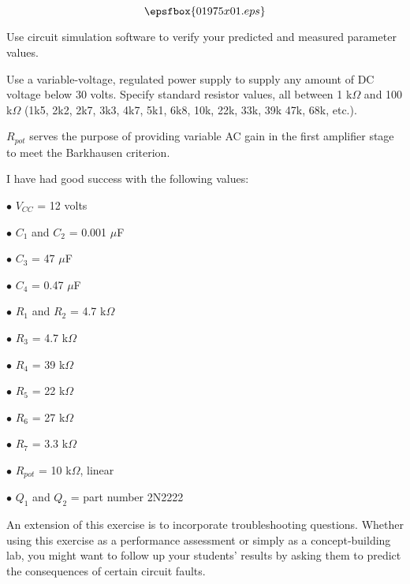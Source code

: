 

$$\epsfbox{01975x01.eps}$$

\vfil \eject






Use circuit simulation software to verify your predicted and measured parameter values.







Use a variable-voltage, regulated power supply to supply any amount of DC voltage below 30 volts.  Specify standard resistor values, all between 1 k$\Omega$ and 100 k$\Omega$ (1k5, 2k2, 2k7, 3k3, 4k7, 5k1, 6k8, 10k, 22k, 33k, 39k 47k, 68k, etc.). 

$R_{pot}$ serves the purpose of providing variable AC gain in the first amplifier stage to meet the Barkhausen criterion.

I have had good success with the following values:

\medskip
\item{$\bullet$} $V_{CC}$ = 12 volts
\item{$\bullet$} $C_1$ and $C_2$ = 0.001 $\mu$F
\item{$\bullet$} $C_3$ = 47 $\mu$F
\item{$\bullet$} $C_4$ = 0.47 $\mu$F
\item{$\bullet$} $R_1$ and $R_2$ = 4.7 k$\Omega$
\item{$\bullet$} $R_3$ = 4.7 k$\Omega$
\item{$\bullet$} $R_4$ = 39 k$\Omega$
\item{$\bullet$} $R_5$ = 22 k$\Omega$
\item{$\bullet$} $R_6$ = 27 k$\Omega$
\item{$\bullet$} $R_7$ = 3.3 k$\Omega$
\item{$\bullet$} $R_{pot}$ = 10 k$\Omega$, linear
\item{$\bullet$} $Q_1$ and $Q_2$ = part number 2N2222
\medskip

An extension of this exercise is to incorporate troubleshooting questions.  Whether using this exercise as a performance assessment or simply as a concept-building lab, you might want to follow up your students' results by asking them to predict the consequences of certain circuit faults.





